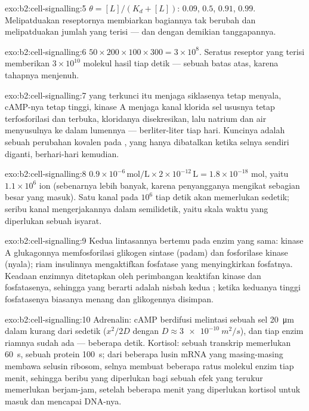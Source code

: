 \begin{solution}{exo:b2:cell-signalling:5}
$\theta = [L]/(K_d + [L])$: $0.09$, $0.5$, $0.91$, $0.99$.
Melipatduakan reseptornya membiarkan bagiannya tak berubah dan
melipatduakan jumlah yang terisi --- dan dengan demikian tanggapannya.
\end{solution}

\begin{solution}{exo:b2:cell-signalling:6}
$50\times 200\times 100\times 300 = 3\times 10^{8}$. Seratus reseptor
yang terisi memberikan $3\times 10^{10}$ molekul hasil tiap detik ---
sebuah batas atas, karena tahapnya menjenuh.
\end{solution}

\begin{solution}{exo:b2:cell-signalling:7}
 yang terkunci itu menjaga siklasenya tetap menyala, cAMP-nya
tetap tinggi, kinase A menjaga kanal klorida sel ususnya tetap
terfosforilasi dan terbuka, kloridanya disekresikan, lalu natrium dan
air menyusulnya ke dalam lumennya --- berliter-liter tiap hari.
Kuncinya adalah sebuah perubahan kovalen pada , yang hanya
dibatalkan ketika selnya sendiri diganti, berhari-hari kemudian.
\end{solution}

\begin{solution}{exo:b2:cell-signalling:8}
$0.9\times 10^{-6}\,\text{mol/L}\times 2\times 10^{-12}\,\text{L} =
1.8\times 10^{-18}$ mol, yaitu $1.1\times 10^{6}$ ion (sebenarnya lebih
banyak, karena penyangganya mengikat sebagian besar yang masuk). Satu
kanal pada $10^{6}$ tiap detik akan memerlukan sedetik; seribu kanal
mengerjakannya dalam semilidetik, yaitu skala waktu yang diperlukan
sebuah isyarat.
\end{solution}

\begin{solution}{exo:b2:cell-signalling:9}
Kedua lintasannya bertemu pada enzim yang sama: kinase A glukagonnya
memfosforilasi glikogen sintase (padam) dan fosforilase kinase
(nyala); riam insulinnya mengaktifkan fosfatase yang menyingkirkan
fosfatnya. Keadaan enzimnya ditetapkan oleh perimbangan keaktifan
kinase dan fosfatasenya, sehingga yang berarti adalah nisbah kedua
; ketika keduanya tinggi fosfatasenya biasanya menang dan
glikogennya disimpan.
\end{solution}

\begin{solution}{exo:b2:cell-signalling:10}
Adrenalin: cAMP berdifusi melintasi sebuah sel \qty{20}{\micro m} dalam
kurang dari sedetik ($x^{2}/2D$ dengan $D \approx \qty{3e-10}{m^2/s}$),
dan tiap enzim riamnya sudah ada --- beberapa detik. Kortisol: sebuah
transkrip memerlukan \qty{60}{s}, sebuah protein \qty{100}{s}; dari
beberapa lusin mRNA yang masing-masing membawa selusin ribosom, selnya
membuat beberapa ratus molekul enzim tiap menit, sehingga beribu yang
diperlukan bagi sebuah efek yang terukur memerlukan berjam-jam, setelah
beberapa menit yang diperlukan kortisol untuk masuk dan mencapai DNA-nya.
\end{solution}

